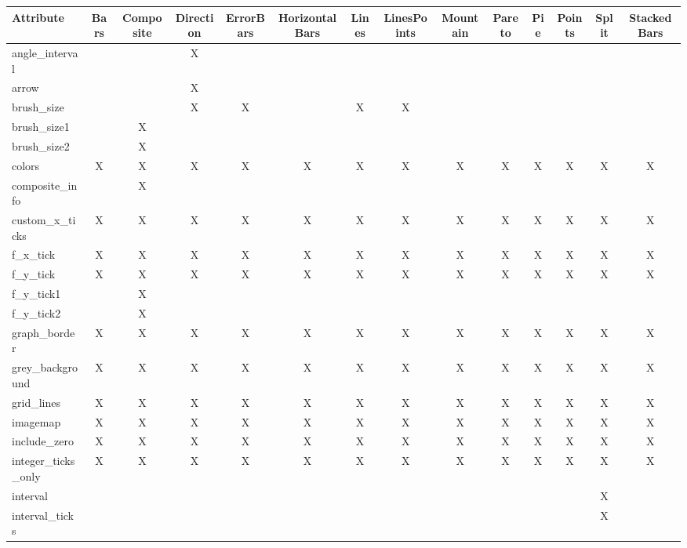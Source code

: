 {
\begin{table}
\tiny
\begin{tabular}{|l|c|c|c|c|c|c|c|c|c|c|c|c|c|}
\hline
Attribute & Bars& Composite& Direction& ErrorBars& HorizontalBars& Lines& LinesPoints& Mountain& Pareto& Pie& Points& Split& StackedBars \\
\hline
angle\_interval        &   &   & X &   &   &   &   &   &   &   &   &   &   \\
arrow                  &   &   & X &   &   &   &   &   &   &   &   &   &   \\
brush\_size            &   &   & X & X &   & X & X &   &   &   &   &   &   \\
brush\_size1           &   & X &   &   &   &   &   &   &   &   &   &   &   \\
brush\_size2           &   & X &   &   &   &   &   &   &   &   &   &   &   \\
colors                 & X & X & X & X & X & X & X & X & X & X & X & X & X \\
composite\_info        &   & X &   &   &   &   &   &   &   &   &   &   &   \\
custom\_x\_ticks       & X & X & X & X & X & X & X & X & X & X & X & X & X \\
f\_x\_tick             & X & X & X & X & X & X & X & X & X & X & X & X & X \\
f\_y\_tick             & X & X & X & X & X & X & X & X & X & X & X & X & X \\
f\_y\_tick1            &   & X &   &   &   &   &   &   &   &   &   &   &   \\
f\_y\_tick2            &   & X &   &   &   &   &   &   &   &   &   &   &   \\
graph\_border          & X & X & X & X & X & X & X & X & X & X & X & X & X \\
grey\_background       & X & X & X & X & X & X & X & X & X & X & X & X & X \\
grid\_lines            & X & X & X & X & X & X & X & X & X & X & X & X & X \\
imagemap               & X & X & X & X & X & X & X & X & X & X & X & X & X \\
include\_zero          & X & X & X & X & X & X & X & X & X & X & X & X & X \\
integer\_ticks\_only   & X & X & X & X & X & X & X & X & X & X & X & X & X \\
interval               &   &   &   &   &   &   &   &   &   &   &   & X &   \\
interval\_ticks        &   &   &   &   &   &   &   &   &   &   &   & X &   \\

\end{tabular}
\end{table}}
